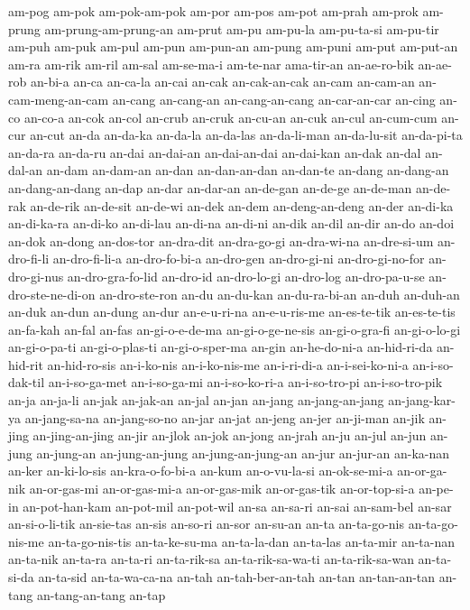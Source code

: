 {am-pog am-pok am-pok-am-pok am-por am-pos am-pot am-prah am-prok am-prung
am-prung-am-prung-an am-prut am-pu am-pu-la am-pu-ta-si am-pu-tir am-puh
am-puk am-pul am-pun am-pun-an am-pung am-puni am-put am-put-an am-ra
am-rik am-ril am-sal am-se-ma-i am-te-nar ama-tir-an an-ae-ro-bik
an-ae-rob an-bi-a an-ca an-ca-la an-cai an-cak an-cak-an-cak an-cam
an-cam-an an-cam-meng-an-cam an-cang an-cang-an an-cang-an-cang
an-car-an-car an-cing an-co an-co-a an-cok an-col an-crub an-cruk an-cu-an
an-cuk an-cul an-cum-cum an-cur an-cut an-da an-da-ka an-da-la an-da-las
an-da-li-man an-da-lu-sit an-da-pi-ta an-da-ra an-da-ru an-dai an-dai-an
an-dai-an-dai an-dai-kan an-dak an-dal an-dal-an an-dam an-dam-an an-dan
an-dan-an-dan an-dan-te an-dang an-dang-an an-dang-an-dang an-dap an-dar
an-dar-an an-de-gan an-de-ge an-de-man an-de-rak an-de-rik an-de-sit
an-de-wi an-dek an-dem an-deng-an-deng an-der an-di-ka an-di-ka-ra
an-di-ko an-di-lau an-di-na an-di-ni an-dik an-dil an-dir an-do an-doi
an-dok an-dong an-dos-tor an-dra-dit an-dra-go-gi an-dra-wi-na
an-dre-si-um an-dro-fi-li an-dro-fi-li-a an-dro-fo-bi-a an-dro-gen
an-dro-gi-ni an-dro-gi-no-for an-dro-gi-nus an-dro-gra-fo-lid an-dro-id
an-dro-lo-gi an-dro-log an-dro-pa-u-se an-dro-ste-ne-di-on an-dro-ste-ron
an-du an-du-kan an-du-ra-bi-an an-duh an-duh-an an-duk an-dun an-dung
an-dur an-e-u-ri-na an-e-u-ris-me an-es-te-tik an-es-te-tis an-fa-kah
an-fal an-fas an-gi-o-e-de-ma an-gi-o-ge-ne-sis an-gi-o-gra-fi
an-gi-o-lo-gi an-gi-o-pa-ti an-gi-o-plas-ti an-gi-o-sper-ma an-gin
an-he-do-ni-a an-hid-ri-da an-hid-rit an-hid-ro-sis an-i-ko-nis
an-i-ko-nis-me an-i-ri-di-a an-i-sei-ko-ni-a an-i-so-dak-til
an-i-so-ga-met an-i-so-ga-mi an-i-so-ko-ri-a an-i-so-tro-pi
an-i-so-tro-pik an-ja an-ja-li an-jak an-jak-an an-jal an-jan an-jang
an-jang-an-jang an-jang-kar-ya an-jang-sa-na an-jang-so-no an-jar an-jat
an-jeng an-jer an-ji-man an-jik an-jing an-jing-an-jing an-jir an-jlok
an-jok an-jong an-jrah an-ju an-jul an-jun an-jung an-jung-an
an-jung-an-jung an-jung-an-jung-an an-jur an-jur-an an-ka-nan an-ker
an-ki-lo-sis an-kra-o-fo-bi-a an-kum an-o-vu-la-si an-ok-se-mi-a
an-or-ga-nik an-or-gas-mi an-or-gas-mi-a an-or-gas-mik an-or-gas-tik
an-or-top-si-a an-pe-in an-pot-han-kam an-pot-mil an-pot-wil an-sa
an-sa-ri an-sai an-sam-bel an-sar an-si-o-li-tik an-sie-tas an-sis
an-so-ri an-sor an-su-an an-ta an-ta-go-nis an-ta-go-nis-me
an-ta-go-nis-tis an-ta-ke-su-ma an-ta-la-dan an-ta-las an-ta-mir an-ta-nan
an-ta-nik an-ta-ra an-ta-ri an-ta-rik-sa an-ta-rik-sa-wa-ti
an-ta-rik-sa-wan an-ta-si-da an-ta-sid an-ta-wa-ca-na an-tah
an-tah-ber-an-tah an-tan an-tan-an-tan an-tang an-tang-an-tang an-tap
}
